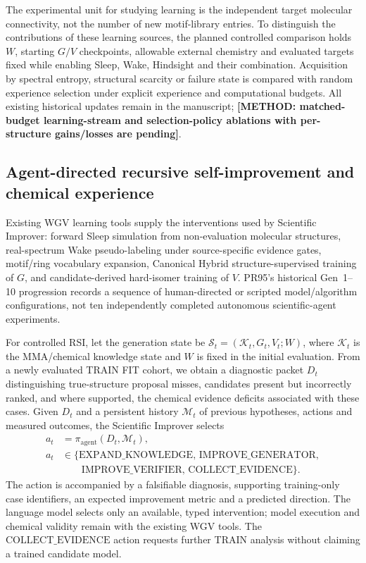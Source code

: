 \documentclass[11pt]{article}
\newcommand{\methodtodo}[1]{\textbf{\textcolor{orbitviolet}{[METHOD: #1]}}}
\begin{document}
The experimental unit for studying learning is the independent target molecular connectivity, not the number of new motif-library entries. To distinguish the contributions of these learning sources, the planned controlled comparison holds \(W\), starting \(G/V\) checkpoints, allowable external chemistry and evaluated targets fixed while enabling Sleep, Wake, Hindsight and their combination. Acquisition by spectral entropy, structural scarcity or failure state is compared with random experience selection under explicit experience and computational budgets. All existing historical updates remain in the manuscript; \methodtodo{matched-budget learning-stream and selection-policy ablations with per-structure gains/losses are pending}.

\subsection*{Agent-directed recursive self-improvement and chemical experience}
Existing WGV learning tools supply the interventions used by Scientific Improver: forward Sleep simulation from non-evaluation molecular structures, real-spectrum Wake pseudo-labeling under source-specific evidence gates, motif/ring vocabulary expansion, Canonical Hybrid structure-supervised training of \(G\), and candidate-derived hard-isomer training of \(V\). PR95's historical Gen~1--10 progression records a sequence of human-directed or scripted model/algorithm configurations, not ten independently completed autonomous scientific-agent experiments.

For controlled RSI, let the generation state be \(\mathcal S_t=(\mathcal K_t,G_t,V_t;W)\), where \(\mathcal K_t\) is the MMA/chemical knowledge state and \(W\) is fixed in the initial evaluation. From a newly evaluated TRAIN FIT cohort, we obtain a diagnostic packet \(D_t\) distinguishing true-structure proposal misses, candidates present but incorrectly ranked, and where supported, the chemical evidence deficits associated with these cases. Given \(D_t\) and a persistent history \(\mathcal M_t\) of previous hypotheses, actions and measured outcomes, the Scientific Improver selects
\[
\begin{aligned}
a_t &= \pi_{\mathrm{agent}}(D_t,\mathcal M_t),\\
a_t &\in\{\mathrm{EXPAND\_KNOWLEDGE},\,\mathrm{IMPROVE\_GENERATOR},\\
    &\qquad \mathrm{IMPROVE\_VERIFIER},\,\mathrm{COLLECT\_EVIDENCE}\}.
\end{aligned}
\]
The action is accompanied by a falsifiable diagnosis, supporting training-only case identifiers, an expected improvement metric and a predicted direction. The language model selects only an available, typed intervention; model execution and chemical validity remain with the existing WGV tools. The \(\mathrm{COLLECT\_EVIDENCE}\) action requests further TRAIN analysis without claiming a trained candidate model.
\end{document}
